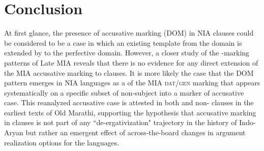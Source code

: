 \documentclass[output=paper,
modfonts
]{LSP/langsci}
\begin{document}
 \section{Conclusion}
At first glance, the presence of accusative marking (DOM)  in NIA  clauses could  be considered to be a case in  which  an existing template from the  domain is extended by  to the perfective  domain. However, a closer study of the -marking patterns of Late MIA reveals that there is no evidence for any direct  extension of the MIA accusative marking to  clauses. It is more likely the case that the DOM pattern emerges in NIA languages as a  of the MIA \textsc{dat/gen} marking that appears systematically  on a specific  subset of  non-subject  into a marker of  accusative case. This reanalyzed accusative case is attested in  both  and non- clauses in the earliest texts of Old Marathi,  supporting the hypothesis that accusative marking in  clauses  is not part of any ``de-ergativization" trajectory 
 in the history of Indo-Aryan  but rather an emergent effect of across-the-board changes in argument realization options for the languages. 
 



\nocite{anderson77, moravcsik1978, condoravdideo14, deo2012, coonpreminger, dixon79, dixon94, plank79ed, delancey1981, tsunoda1985, andersen86, peterson98, pischel00, bubenik98, bubenik96, bloch65, Vale48, masica91, declercq2010, comrie78, anderson2004}
\end{document}
